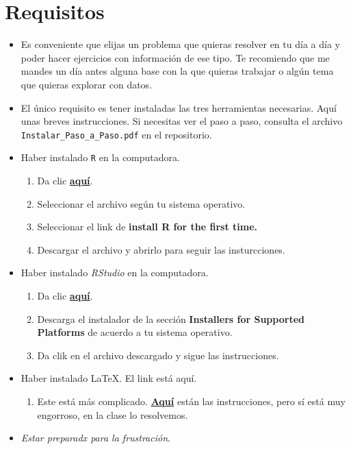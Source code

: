 \documentclass[]{article}
\providecommand{\tightlist}{%
  \setlength{\itemsep}{0pt}\setlength{\parskip}{0pt}}
\begin{document}
\section{Requisitos}\label{requisitos}

\begin{itemize}
\item
  Es conveniente que elijas un problema que quieras resolver en tu día a
  día y poder hacer ejercicios con información de ese tipo. Te
  recomiendo que me mandes un día antes alguna base con la que quieras
  trabajar o algún tema que quieras explorar con datos.
\item
  El único requisito es tener instaladas las tres herramientas
  necesarias. Aquí unas breves instrucciones. Si necesitas ver el paso a
  paso, consulta el archivo \texttt{Instalar\_Paso\_a\_Paso.pdf} en el
  repositorio.
\item
  Haber instalado \texttt{R} en la computadora.

  \begin{enumerate}
  \def\labelenumi{\arabic{enumi}.}
  \tightlist
  \item
    Da clic \href{https://cran.itam.mx/}{\textbf{aquí}}.
  \item
    Seleccionar el archivo según tu sistema operativo.
  \item
    Seleccionar el link de \textbf{install R for the first time.}
  \item
    Descargar el archivo y abrirlo para seguir las insturcciones.
  \end{enumerate}
\item
  Haber instalado \emph{RStudio} en la computadora.

  \begin{enumerate}
  \def\labelenumi{\arabic{enumi}.}
  \tightlist
  \item
    Da clic
    \href{https://www.rstudio.com/products/rstudio/download/\#download}{\textbf{aquí}}.
  \item
    Descarga el instalador de la sección \textbf{Installers for
    Supported Platforms} de acuerdo a tu sistema operativo.
  \item
    Da clik en el archivo descargado y sigue las instrucciones.
  \end{enumerate}
\item
  Haber instalado \LaTeX. El link está aquí.

  \begin{enumerate}
  \def\labelenumi{\arabic{enumi}.}
  \tightlist
  \item
    Este está más complicado.
    \href{https://www.latex-project.org/get/}{\textbf{Aquí}} están las
    instrucciones, pero sí está muy engorroso, en la clase lo
    resolvemos.
  \end{enumerate}
\item
  \emph{Estar preparadx para la frustración}.
\end{itemize}
\end{document}
